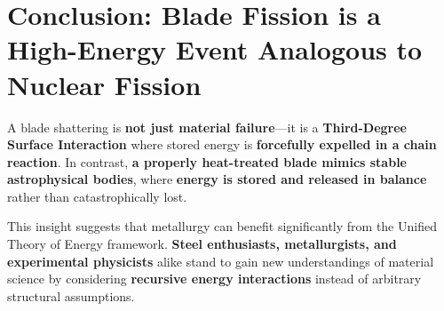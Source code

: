 \documentclass{article}
\begin{document}
\section{Conclusion: Blade Fission is a High-Energy Event Analogous to Nuclear Fission}
A blade shattering is \textbf{not just material failure}—it is a \textbf{Third-Degree Surface Interaction} where stored energy is \textbf{forcefully expelled in a chain reaction}. In contrast, \textbf{a properly heat-treated blade mimics stable astrophysical bodies}, where \textbf{energy is stored and released in balance} rather than catastrophically lost.

This insight suggests that metallurgy can benefit significantly from the Unified Theory of Energy framework. \textbf{Steel enthusiasts, metallurgists, and experimental physicists} alike stand to gain new understandings of material science by considering \textbf{recursive energy interactions} instead of arbitrary structural assumptions.
\end{document}

